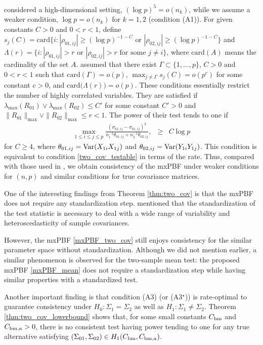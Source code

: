 \documentclass[11pt]{article}
\newcommand{\bea}{\begin{eqnarray*}}
\newcommand{\eea}{\end{eqnarray*}}
\newcommand{\V}{{\rm Var}}
\newcommand{\sg}{\Sigma}
\begin{document}
\cite{cai2013two} considered a high-dimensional setting, $(\log p)^5 = o(n_k)$, while we assume a weaker condition, $\log p = o(n_k)$ for $k=1,2$ (condition (A1)).
For given constants $C>0$ and $0<r<1$, define $s_j(C) = \text{card}\{i: |\rho_{01,ij}| \ge (\log p )^{-1-C} \text{ or } |\rho_{02,ij}| \ge (\log p )^{-1-C}  \}$ and $\Lambda(r) = \{i : |\rho_{01,ij}|  >r \text{ or } |\rho_{02,ij}|>r \text{ for some } j \neq i    \}$, where $\text{card}(A)$ means the cardinality of the set $A$.
\cite{cai2013two} assumed that there exist $\Gamma \subset \{1,\ldots, p \}$, $C>0$ and $0<r<1$ such that $\text{card}(\Gamma) =o(p)$, $\max_{j \neq \Gamma} s_j(C) = o(p^{c})$ for some constant $c>0$, and $\text{card(}\Lambda(r)) = o(p)$.
These conditions essentially restrict the number of highly correlated variables.
They are satisfied if $\lambda_{\max}(R_{01}) \vee \lambda_{\max}(R_{02}) \le C'$ for some constant $C'>0$ and $\|R_{01}\|_{\max} \vee \|R_{02}\|_{\max} \le r <1$. 
The power of their test tends to one if 
\bea
\max_{1\le i\le j\le p} \frac{ (\sigma_{01,ij} - \sigma_{01,ij})^2 }{ n_1^{-1}\theta_{01,ij} + n_2^{-1} \theta_{02,ij} },
&\ge& C  \log p  
\eea
for $C \ge 4$, where $\theta_{01,ij} = \V( X_{1i}X_{1j} )$ and $\theta_{02,ij} = \V( Y_{1i}Y_{1j} )$.
This condition is equivalent to condition \eqref{two_cov_testable} in terms of the rate.
Thus, compared with those used in \cite{cai2013two}, we obtain consistency of the mxPBF under weaker conditions for $(n,p)$ and similar conditions for true covariance matrices.

One of the interesting findings from Theorem \ref{thm:two_cov} is that the mxPBF does not require any standardization step.
\cite{cai2013two} mentioned that the standardization of the test statistic is necessary to deal with a wide range of variability and heteroscedasticity of sample covariances.

However, the mxPBF \eqref{mxPBF_two_cov} still enjoys consistency for the similar parameter space without standardization.
Although we did not mention earlier,  a similar phenomenon is observed for the two-sample mean test: the proposed mxPBF \eqref{mxPBF_mean} does not require a standardization step while having similar properties with a standardized test.



Another important finding is that condition (A3) (or (A3$^\star$)) is rate-optimal to guarantee consistency under $H_0:\sg_1=\sg_2$ as well as $H_1:\sg_1\neq \sg_2$.
Theorem \ref{thm:two_cov_lowerbound} shows that, for some small constants $C_{\rm bm}$ and $C_{{\rm bm},a} >0$, there is no consistent test having power tending to one for any true alternative satisfying $(\sg_{01},\sg_{02}) \in {H}_1(C_{\rm bm}, C_{{\rm bm},a})$.
\end{document}
